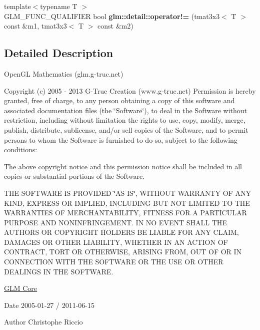 \begin{DoxyCompactItemize}
\item 
\hypertarget{namespaceglm_1_1detail_aa86795cb0a4455548dc35fa6edf2e034}{}{\footnotesize template$<$typename T $>$ }\\G\+L\+M\+\_\+\+F\+U\+N\+C\+\_\+\+Q\+U\+A\+L\+I\+F\+I\+E\+R bool {\bfseries glm\+::detail\+::operator!=} (tmat3x3$<$ T $>$ const \&m1, tmat3x3$<$ T $>$ const \&m2)\label{namespaceglm_1_1detail_aa86795cb0a4455548dc35fa6edf2e034}

\end{DoxyCompactItemize}


\subsection{Detailed Description}
Open\+G\+L Mathematics (glm.\+g-\/truc.\+net)

Copyright (c) 2005 -\/ 2013 G-\/\+Truc Creation (www.\+g-\/truc.\+net) Permission is hereby granted, free of charge, to any person obtaining a copy of this software and associated documentation files (the \char`\"{}\+Software\char`\"{}), to deal in the Software without restriction, including without limitation the rights to use, copy, modify, merge, publish, distribute, sublicense, and/or sell copies of the Software, and to permit persons to whom the Software is furnished to do so, subject to the following conditions\+:

The above copyright notice and this permission notice shall be included in all copies or substantial portions of the Software.

T\+H\+E S\+O\+F\+T\+W\+A\+R\+E I\+S P\+R\+O\+V\+I\+D\+E\+D \char`\"{}\+A\+S I\+S\char`\"{}, W\+I\+T\+H\+O\+U\+T W\+A\+R\+R\+A\+N\+T\+Y O\+F A\+N\+Y K\+I\+N\+D, E\+X\+P\+R\+E\+S\+S O\+R I\+M\+P\+L\+I\+E\+D, I\+N\+C\+L\+U\+D\+I\+N\+G B\+U\+T N\+O\+T L\+I\+M\+I\+T\+E\+D T\+O T\+H\+E W\+A\+R\+R\+A\+N\+T\+I\+E\+S O\+F M\+E\+R\+C\+H\+A\+N\+T\+A\+B\+I\+L\+I\+T\+Y, F\+I\+T\+N\+E\+S\+S F\+O\+R A P\+A\+R\+T\+I\+C\+U\+L\+A\+R P\+U\+R\+P\+O\+S\+E A\+N\+D N\+O\+N\+I\+N\+F\+R\+I\+N\+G\+E\+M\+E\+N\+T. I\+N N\+O E\+V\+E\+N\+T S\+H\+A\+L\+L T\+H\+E A\+U\+T\+H\+O\+R\+S O\+R C\+O\+P\+Y\+R\+I\+G\+H\+T H\+O\+L\+D\+E\+R\+S B\+E L\+I\+A\+B\+L\+E F\+O\+R A\+N\+Y C\+L\+A\+I\+M, D\+A\+M\+A\+G\+E\+S O\+R O\+T\+H\+E\+R L\+I\+A\+B\+I\+L\+I\+T\+Y, W\+H\+E\+T\+H\+E\+R I\+N A\+N A\+C\+T\+I\+O\+N O\+F C\+O\+N\+T\+R\+A\+C\+T, T\+O\+R\+T O\+R O\+T\+H\+E\+R\+W\+I\+S\+E, A\+R\+I\+S\+I\+N\+G F\+R\+O\+M, O\+U\+T O\+F O\+R I\+N C\+O\+N\+N\+E\+C\+T\+I\+O\+N W\+I\+T\+H T\+H\+E S\+O\+F\+T\+W\+A\+R\+E O\+R T\+H\+E U\+S\+E O\+R O\+T\+H\+E\+R D\+E\+A\+L\+I\+N\+G\+S I\+N T\+H\+E S\+O\+F\+T\+W\+A\+R\+E.

\hyperlink{group__core}{G\+L\+M Core}

\begin{DoxyDate}{Date}
2005-\/01-\/27 / 2011-\/06-\/15 
\end{DoxyDate}
\begin{DoxyAuthor}{Author}
Christophe Riccio 
\end{DoxyAuthor}
